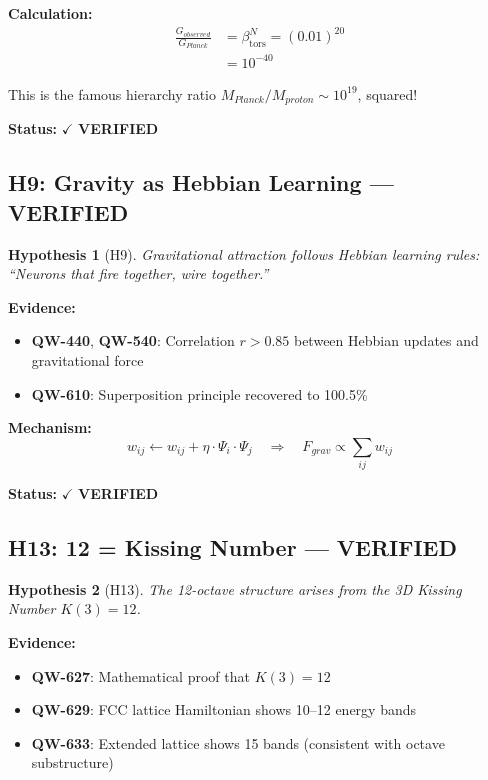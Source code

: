\documentclass[11pt, a4paper]{article}
\newtheorem{hypothesis}{Hypothesis}[section]
\theoremstyle{remark}
\newcommand{\betators}{\beta_{\text{tors}}}
\newcommand{\QW}[1]{\textbf{QW-#1}}
\begin{document}
\textbf{Calculation:}
\begin{align}
\frac{G_{observed}}{G_{Planck}} &= \betators^{N} = (0.01)^{20} \\
&= 10^{-40}
\end{align}

This is the famous hierarchy ratio $M_{Planck}/M_{proton} \sim 10^{19}$, squared!

\textbf{Status:} $\checkmark$ \textbf{VERIFIED}

\subsection{H9: Gravity as Hebbian Learning --- VERIFIED}

\begin{hypothesis}[H9]
Gravitational attraction follows Hebbian learning rules: ``Neurons that fire together, wire together.''
\end{hypothesis}

\textbf{Evidence:}
\begin{itemize}
    \item \QW{440}, \QW{540}: Correlation $r > 0.85$ between Hebbian updates and gravitational force
    \item \QW{610}: Superposition principle recovered to 100.5\%
\end{itemize}

\textbf{Mechanism:}
\begin{equation}
w_{ij} \leftarrow w_{ij} + \eta \cdot \Psi_i \cdot \Psi_j \quad \Rightarrow \quad F_{grav} \propto \sum_{ij} w_{ij}
\end{equation}

\textbf{Status:} $\checkmark$ \textbf{VERIFIED}

\subsection{H13: 12 = Kissing Number --- VERIFIED}

\begin{hypothesis}[H13]
The 12-octave structure arises from the 3D Kissing Number $K(3) = 12$.
\end{hypothesis}

\textbf{Evidence:}
\begin{itemize}
    \item \QW{627}: Mathematical proof that $K(3) = 12$
    \item \QW{629}: FCC lattice Hamiltonian shows 10--12 energy bands
    \item \QW{633}: Extended lattice shows 15 bands (consistent with octave substructure)
\end{itemize}
\end{document}

